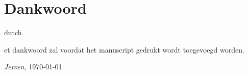 \chapter*{Dankwoord}
\label{dankwoord}
\fancyhead[RO]{\thepage}
\fancyhead[LE]{\thepage}
\begin{otherlanguage*}{dutch}

\lettrine{}{}et dankwoord zal voordat het manuscript gedrukt wordt toegevoegd worden.

\hfill \textit{Jeroen}, \today
\end{otherlanguage*}

